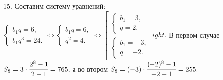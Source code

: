 15. Составим систему уравнений: $\begin{cases}b_1q=6,\\b_1q^3=24.\end{cases}\Leftrightarrow\begin{cases}b_1q=6,\\q^2=4.\end{cases}
\Leftrightarrow\left[\begin{array}{l}\begin{cases}b_1=3,\\q=2.\end{cases}\\ \begin{cases}b_1=-3,\\q=-2.\end{cases}\end{array}
ight.$ В первом случае
$S_8=3\cdot\cfrac{2^8-1}{2-1}=765,$ а во втором $S_8=(-3)\cdot\cfrac{(-2)^8-1}{-2-1}=255.$\\
